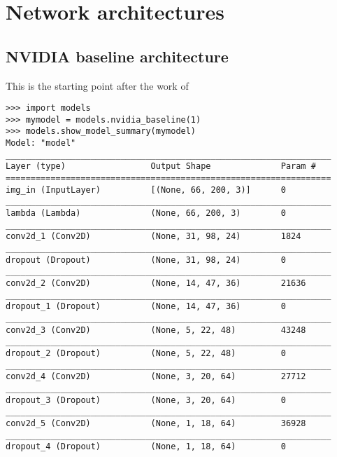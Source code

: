 \chapter{Network architectures} %

\label{AppendixB} %

\section{NVIDIA baseline architecture}
\label{NVIDIA_baseline}
\label{arc:nvidia_baseline}

This is the starting point after the work of \cite{bojarski2016end}

\begin{verbatim}
>>> import models
>>> mymodel = models.nvidia_baseline(1)
>>> models.show_model_summary(mymodel)
Model: "model"
_________________________________________________________________
Layer (type)                 Output Shape              Param #   
=================================================================
img_in (InputLayer)          [(None, 66, 200, 3)]      0         
_________________________________________________________________
lambda (Lambda)              (None, 66, 200, 3)        0         
_________________________________________________________________
conv2d_1 (Conv2D)            (None, 31, 98, 24)        1824      
_________________________________________________________________
dropout (Dropout)            (None, 31, 98, 24)        0         
_________________________________________________________________
conv2d_2 (Conv2D)            (None, 14, 47, 36)        21636     
_________________________________________________________________
dropout_1 (Dropout)          (None, 14, 47, 36)        0         
_________________________________________________________________
conv2d_3 (Conv2D)            (None, 5, 22, 48)         43248     
_________________________________________________________________
dropout_2 (Dropout)          (None, 5, 22, 48)         0         
_________________________________________________________________
conv2d_4 (Conv2D)            (None, 3, 20, 64)         27712     
_________________________________________________________________
dropout_3 (Dropout)          (None, 3, 20, 64)         0         
_________________________________________________________________
conv2d_5 (Conv2D)            (None, 1, 18, 64)         36928     
_________________________________________________________________
dropout_4 (Dropout)          (None, 1, 18, 64)         0         

\end{verbatim}
